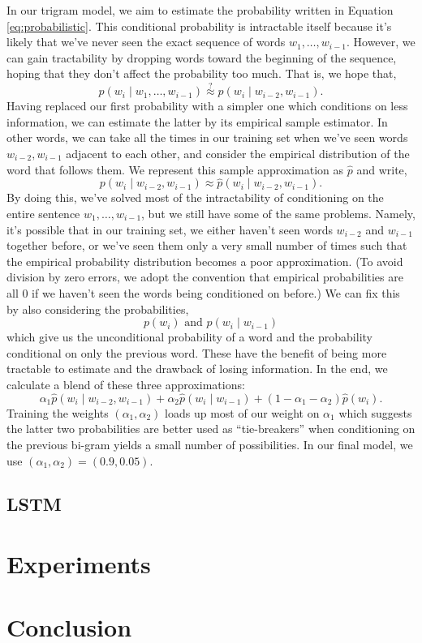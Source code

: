 \documentclass[12pt]{article}
\begin{document}
In our trigram model, we aim to estimate the probability written in Equation
\ref{eq:probabilistic}. This conditional probability is intractable itself
because it's likely that we've never seen the exact sequence of words $w_1,
\ldots, w_{i-1}$. However, we can gain tractability by dropping words toward the
beginning of the sequence, hoping that they don't affect the probability too
much. That is, we hope that,
\[ p(w_i \mid w_1, \ldots, w_{i-1}) \stackrel{?}{\approx} p(w_i \mid w_{i-2},
w_{i-1}).\]
Having replaced our first probability with a simpler one which conditions on
less information, we can estimate the latter by its empirical sample estimator.
In other words, we can take all the times in our training set when we've seen
words $w_{i-2}, w_{i-1}$ adjacent to each other, and consider the empirical
distribution of the word that follows them. We represent this sample
approximation as $\hat{p}$ and write,
\[ p (w_i \mid w_{i-2}, w_{i-1}) \approx \hat{p} (w_i \mid w_{i-2}, w_{i-1}).\]
By doing this, we've solved most of the intractability of conditioning on the
entire sentence $w_1, \ldots, w_{i-1}$, but we still have some of the same
problems. Namely, it's possible that in our training set, we either haven't seen
words $w_{i-2}$ and $w_{i-1}$ together before, or we've seen them only a very
small number of times such that the empirical probability distribution becomes a
poor approximation. (To avoid division by zero errors, we adopt the convention
that empirical probabilities are all 0 if we haven't seen the words being
conditioned on before.) We can fix this by also considering the probabilities,
\[ p(w_i) \text{ and } p(w_i \mid w_{i-1})\]
which give us the unconditional probability of a word and the probability
conditional on only the previous word. These have the benefit of being more
tractable to estimate and the drawback of losing information. In the end, we
calculate a blend of these three approximations:
\[ \alpha_1 \hat{p}(w_i \mid w_{i-2}, w_{i-1}) + \alpha_2 \hat{p}(w_i \mid w_{i-1}) +
(1-\alpha_1-\alpha_2)\hat{p}(w_i).\]
Training the weights $(\alpha_1, \alpha_2)$ loads up most of our weight on
$\alpha_1$ which suggests the latter two probabilities are better used as
``tie-breakers'' when conditioning on the previous bi-gram yields a small number
of possibilities. In our final model, we use $(\alpha_1, \alpha_2) = (0.9,
0.05)$. 


\subsection{LSTM}
\label{subsec:lstm}


\section{Experiments}
\section{Conclusion}




\end{document}
